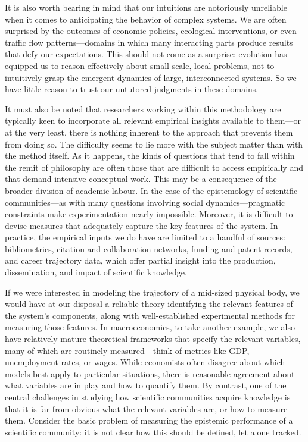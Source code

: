 \documentclass{article}
\begin{document}
It is also worth bearing in mind that our intuitions are notoriously unreliable when it comes to anticipating the behavior of complex systems. We are often surprised by the outcomes of economic policies, ecological interventions, or even traffic flow patterns—domains in which many interacting parts produce results that defy our expectations. This should not come as a surprise: evolution has equipped us to reason effectively about small-scale, local problems, not to intuitively grasp the emergent dynamics of large, interconnected systems. So we have little reason to trust our untutored judgments in these domains.

It must also be noted that researchers working within this methodology are typically keen to incorporate all relevant empirical insights available to them—or at the very least, there is nothing inherent to the approach that prevents them from doing so. The difficulty seems to lie more with the subject matter than with the method itself. As it happens, the kinds of questions that tend to fall within the remit of philosophy are often those that are difficult to access empirically and that demand intensive conceptual work. This may be a consequence of the broader division of academic labour. In the case of the epistemology of scientific communities—as with many questions involving social dynamics—pragmatic constraints make experimentation nearly impossible. Moreover, it is difficult to devise measures that adequately capture the key features of the system. In practice, the empirical inputs we do have are limited to a handful of sources: bibliometrics, citation and collaboration networks, funding and patent records, and career trajectory data, which offer partial insight into the production, dissemination, and impact of scientific knowledge.

If we were interested in modeling the trajectory of a mid-sized physical body, we would have at our disposal a reliable theory identifying the relevant features of the system's components, along with well-established experimental methods for measuring those features. In macroeconomics, to take another example, we also have relatively mature theoretical frameworks that specify the relevant variables, many of which are routinely measured—think of metrics like GDP, unemployment rates, or wages. While economists often disagree about which models best apply to particular situations, there is reasonable agreement about what variables are in play and how to quantify them. By contrast, one of the central challenges in studying how scientific communities acquire knowledge is that it is far from obvious what the relevant variables are, or how to measure them. Consider the basic problem of measuring the epistemic performance of a scientific community: it is not clear how this should be defined, let alone tracked.
\end{document}
